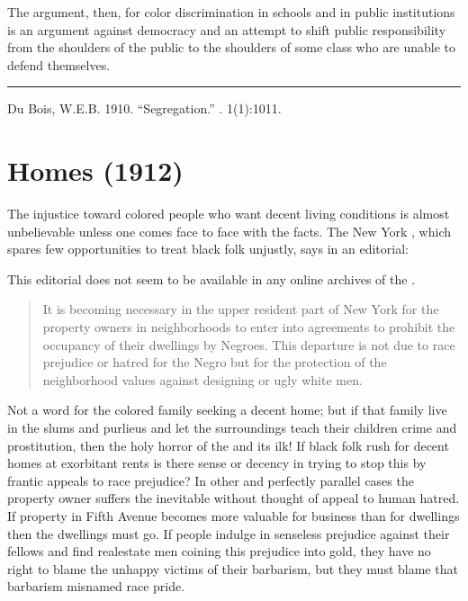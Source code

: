 \documentclass[letterpaper,10pt,english]{jupyterBook}
\begin{document}
\sphinxAtStartPar
The argument, then, for color discrimination in schools and in public institutions is an argument against democracy and an attempt to shift public responsibility from the shoulders of the public to the shoulders of some class who are unable to defend themselves.


\bigskip\hrule\bigskip


\sphinxAtStartPar
{} Du Bois, W.E.B. 1910. “Segregation.” . 1(1):10\sphinxhyphen{}11.


\section{Homes (1912)}
\label{\detokenize{Volumes/03/05/homes:homes-1912}}\label{\detokenize{Volumes/03/05/homes::doc}}
\sphinxAtStartPar
The injustice toward colored people who want decent living conditions is almost unbelievable unless one comes face to face with the facts. The New York , which spares few opportunities to treat black folk unjustly, says in an editorial:

\begin{sphinxShadowBox}
\sphinxstylesidebartitle{}

\sphinxAtStartPar
This editorial does not seem to be available in any online archives of the .
\end{sphinxShadowBox}
\begin{quote}

\sphinxAtStartPar
It is becoming necessary in the upper resident part of New York for the property owners in neighborhoods to enter into agreements to prohibit the occupancy of their dwellings by Negroes. This departure is not due to race prejudice or hatred for the Negro but for the protection of the neighborhood values against designing or ugly white men.
\end{quote}

\sphinxAtStartPar
Not a word for the colored family seeking a decent home; but if that family live in the slums and purlieus and let the surroundings teach their children crime and prostitution, then the holy horror of the  and its ilk! If black folk rush for decent homes at exorbitant rents is there sense or decency in trying to stop this by frantic appeals to race prejudice? In other and perfectly parallel cases the property owner suffers the inevi­table without thought of appeal to human hatred. If property in Fifth Avenue becomes more valuable for business than for dwellings then the dwellings must go. If people indulge in senseless prejudice against their fellows and find real\sphinxhyphen{}estate men coining this prejudice into gold, they have no right to blame the unhappy victims of their barbarism, but they must blame that barbarism misnamed race pride.
\end{document}
